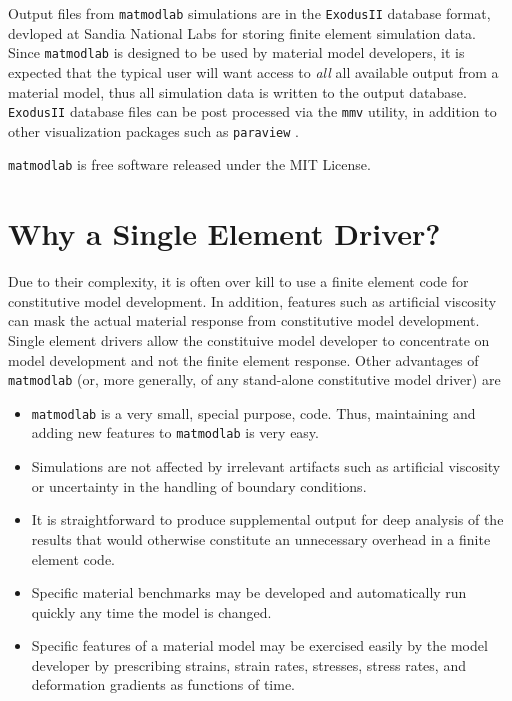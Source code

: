 \documentclass[12pt,report,strict]{SANDreport/SANDreport}
\newcommand{\mml}{\texttt{matmodlab}}
\newcommand{\mmv}{\texttt{mmv}}
\newcommand{\exodusii}{{\sc\texttt{ExodusII}}}
\newcommand{\paraview}[1]{{\sc\texttt{paraview}}}
\begin{document}
Output files from \mml{} simulations are in the \exodusii{} \cite{exodus}
database format, devloped at Sandia National Labs for storing finite element
simulation data. Since \mml{} is designed to be used by material model
developers, it is expected that the typical user will want access to
\emph{all} all available output from a material model, thus all simulation
data is written to the output database. \exodusii{} database files can be post
processed via the \mmv{} utility, in addition to other visualization
packages such as \paraview{} \cite{paraview}.

\mml{} is free software released under the MIT License.

\section{Why a Single Element Driver?}
\label{sec:why}
Due to their complexity, it is often over kill to use a finite element code
for constitutive model development. In addition, features such as artificial
viscosity can mask the actual material response from constitutive model
development. Single element drivers allow the constituive model developer to
concentrate on model development and not the finite element response. Other
advantages of \mml{} (or, more generally, of any stand-alone
constitutive model driver) are

\begin{itemize}
  \item \mml{} is a very small, special purpose, code. Thus, maintaining and
  adding new features to \mml{} is very easy.

  \item Simulations are not affected by irrelevant artifacts such as
  artificial viscosity or uncertainty in the handling of boundary conditions.

  \item It is straightforward to produce supplemental output for deep analysis
  of the results that would otherwise constitute an unnecessary overhead in a
  finite element code.

  \item Specific material benchmarks may be developed and automatically run
  quickly any time the model is changed.

  \item Specific features of a material model may be exercised easily by the
  model developer by prescribing strains, strain rates, stresses, stress
  rates, and deformation gradients as functions of time.
\end{itemize}
\end{document}
